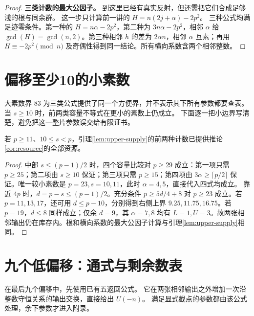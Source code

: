 \begin{proof}
\par\noindent\textbf{三类计数的最大公因子。}
到这里已经有真实反射，但还需把它们合成足够浅的根与同余群。
这一步只计算前一讲的 $H=n(2j+\alpha)-2p^2$。
三种公式均满足迹零条件。第一种的 $H=n\alpha-2p^2$，第二种为 $3n\alpha-2p^2$，相邻 $\alpha$ 给 $\gcd(H)=\gcd(n,2)$。第三种相邻 $h$ 的差为 $2\alpha n$，相邻 $\alpha$ 互素；再用 $H\equiv-2p^2\pmod n$ 及奇偶性得到同一结论。所有横向系数含两个相邻整数。
\end{proof}


\section{偏移至少10的小素数}
大素数界 $83$ 为三类公式提供了同一个方便界，并不表示其下所有参数都要查表。
当 $s\ge10$ 时，前两类容量不等式在更小的素数上仍成立。
下面逐一把小边界写清楚，避免把这一整片参数误交给有限证书。

\begin{lemma}\label{lem:upper-small}
若 $p\ge11$、$10\le s<p$，引理\ref{lem:upper-supply}的前两种计数已提供推论\ref{cor:resource}的全部资源。
\end{lemma}
\begin{proof}
中部 $s\le(p-1)/2$ 时，四个容量比较对 $p\ge29$ 成立：第一项只需 $p\ge25$；第二项由 $s\ge10$ 保证；第三项只需 $p\ge15$；第四项由 $3\alpha\ge\lceil p/2\rceil$ 保证。唯一较小素数是 $p=23,s=10,11$，此时 $\alpha=4,5$，直接代入四式均成立。
靠近 $4p$ 时，$d=p-s\le(p-1)/2$。充分条件 $p\ge5d/4+8$ 对 $p\ge23$ 成立。若 $p=11,13,17$，还可用 $d\le p-10$，分别得到右侧上界 $9.25,11.75,16.75$。若 $p=19$，$d\le8$ 同样成立；仅余 $d=9$，其 $\alpha=7,8$ 均有 $L=1,U=3$。故两张相邻输出仍在库存内。根和横向系数的最大公因子计算与引理\ref{lem:upper-supply}相同。
\end{proof}


\section{九个低偏移：通式与剩余数表}
在最后九个偏移中，先使用已有五返回公式。
它在两张相邻输出之外增加一次沿整数守恒关系的输出交换，直接给出 $U(-n)$。
满足显式截点的参数都由该公式处理，余下参数才进入附录。

